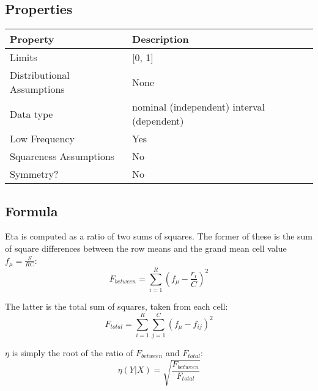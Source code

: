 \documentclass[11pt]{article}
\begin{document}
\subsection{Properties}
\begin{tabular}{| l || l |}
    \hline
    {\bf Property} & {\bf Description} \\
    \hline
    Limits & [0, 1] \\ \hline

    Distributional Assumptions& None \\ \hline

    Data type & nominal (independent) interval (dependent) \\ \hline

    Low Frequency & Yes \\ \hline

    Squareness Assumptions & No \\ \hline
    
    Symmetry? & No \\ \hline

\end{tabular}


\subsection{Formula}

Eta is computed as a ratio of two sums of squares.  The former of these is the sum of square differences between the row means and the grand mean cell value $f_\mu = \frac{S}{RC}$:
$$
F_{between} = \sum_{i=1}^{R}{    \left(   f_\mu -   \frac {r_i}{C} \right)^2  }
$$

The latter is the total sum of squares, taken from each cell:
$$
F_{total} = \sum_{i=1}^{R}{ \sum_{j=1}^{C}{   ( f_\mu - f_{ij} )^2    } }
$$

$\eta$ is simply the root of the ratio of $F_{between}$ and $F_{total}$:
$$
\eta(Y|X) = \sqrt{  \frac{ F_{between} }{ F_{total} }   }
$$
\end{document}
